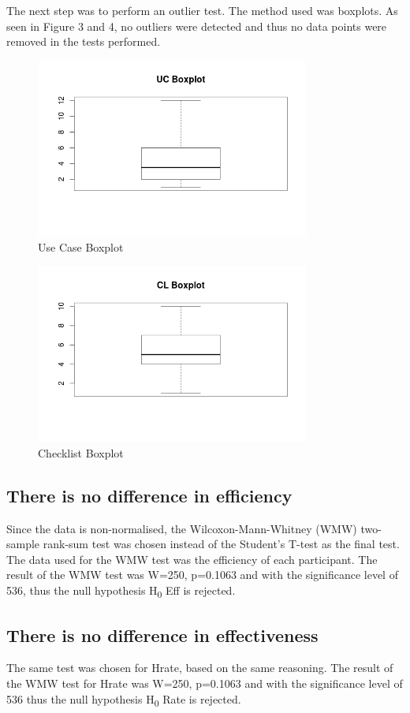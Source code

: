\documentclass[10pt,twocolumn]{article}
\begin{document}
The next step was to perform an outlier test. The method used was boxplots. As seen in Figure 3 and 4, no outliers were detected and thus no data points were removed in the tests performed. 

\begin{figure}[ht]
\centering
\includegraphics[width=90mm]{uc_box.png}
\caption{Use Case Boxplot}
\end{figure}

\begin{figure}[ht]
\centering
\includegraphics[width=90mm]{cl_box.png}
\caption{Checklist Boxplot}
\end{figure}



\subsection{There is no difference in efficiency}
Since the data is non-normalised, the Wilcoxon-Mann-Whitney (WMW) two-sample rank-sum test was chosen instead of the Student's T-test as the final test. The data used for the WMW test was the efficiency of each participant. The result of the WMW test was W=250, p=0.1063 and with the significance level of 536, thus the null hypothesis H\textsubscript{0} Eff is rejected. 

\subsection{There is no difference in effectiveness}
The same test was chosen for Hrate, based on the same reasoning. The result of the WMW test for Hrate was W=250, p=0.1063 and with the significance level of 536 thus the null hypothesis H\textsubscript{0} Rate is rejected. 
\end{document}
